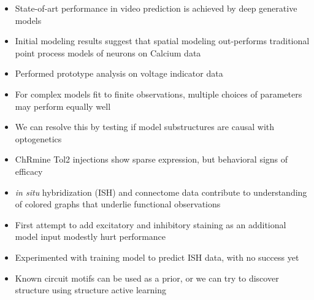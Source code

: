 \begin{frame}{\aimOne}
  \textbf{\qOne}
  \begin{itemize}
    \item State-of-art performance in video prediction is achieved by deep generative models
    \item Initial modeling results suggest that spatial modeling out-performs traditional point process models of neurons on Calcium data
    \item Performed prototype analysis on voltage indicator data
  \end{itemize}
\end{frame}

\begin{frame}{\aimTwo}
  \textbf{\qTwo}
  \begin{itemize}
    \item For complex models fit to finite observations, multiple choices of parameters may perform equally well
    \item We can resolve this by testing if model substructures are causal with optogenetics
    \item ChRmine Tol2 injections show sparse expression, but behavioral signs of efficacy
  \end{itemize}
\end{frame}

\begin{frame}{\aimThree}
  \textbf{\qThree}
  \begin{itemize}
    \item \emph{in situ} hybridization (ISH) and connectome data contribute to understanding of colored graphs that underlie functional observations
    \item First attempt to add excitatory and inhibitory staining as an additional model input modestly hurt performance
    \item Experimented with training model to predict ISH data, with no success yet
    \item Known circuit motifs can be used as a prior, or we can try to discover structure using structure active learning
  \end{itemize}
\end{frame}
